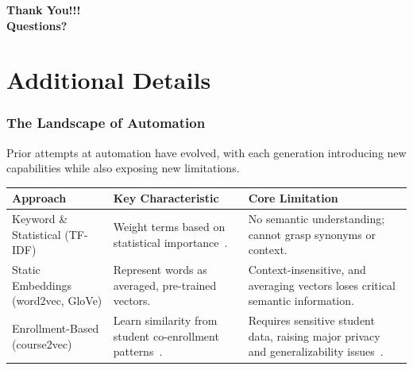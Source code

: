 \documentclass[aspectratio=169,10pt]{beamer}
\begin{document}
\begin{frame}
    \frametitle{} %
    \vfill %
    \centering
    {\Huge \textbf{Thank You!!!}}\\
    \vspace{5em}
    {\Huge \textbf{Questions?}}
    \vfill
\end{frame}

\section{Additional Details}
\begin{frame}
    \frametitle{The Landscape of Automation}
    
    Prior attempts at automation have evolved, with each generation introducing new capabilities while also exposing new limitations.
    
    \vspace{1em}

    \footnotesize
    \renewcommand{\arraystretch}{1.5} %
    \begin{tabularx}{\textwidth}{>{\raggedright\arraybackslash}p{2.7cm} >{\raggedright\arraybackslash}X >{\raggedright\arraybackslash}X}
    \toprule
    \textbf{Approach} & \textbf{Key Characteristic} & \textbf{Core Limitation} \\
    \midrule
    
    Keyword \& Statistical (TF-IDF)
    & Weight terms based on statistical importance~\cite{AIZAWA200345}.
    & No semantic understanding; cannot grasp synonyms or context. \\
    
    \addlinespace %
    
    Static Embeddings (word2vec, GloVe)
    & Represent words as averaged, pre-trained vectors.
    & Context-insensitive, and averaging vectors loses critical semantic information. \\
    
    \addlinespace
    
    Enrollment-Based (course2vec)
    & Learn similarity from student co-enrollment patterns~\cite{PardosCourse2Vec2019}.
    & Requires sensitive student data, raising major privacy and generalizability issues~\cite{slade10.1177/0002764213479366}. \\
    

\end{tabularx}
\end{frame}
\end{document}
